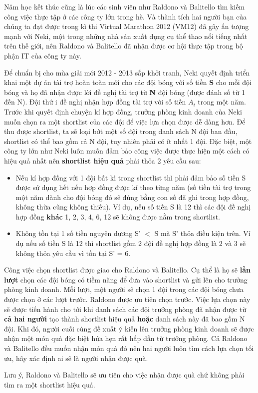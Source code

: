 Năm học kết thúc cũng là lúc các sinh viên như Raldono và Balitello tìm kiếm công việc thực tập ở các công ty lớn trong hè. Và thành tích hai người bạn của chúng ta đạt được trong kì thi Virtual Marathon 2012 (VM12) đã gây ấn tượng mạnh với Neki, một trong những nhà sản xuất dụng cụ thể thao nổi tiếng nhất trên thế giới, nên Raldono và Balitello đã nhận được cơ hội thực tập trong bộ phận IT của công ty này.

Để chuẩn bị cho mùa giải mới 2012 - 2013 sắp khởi tranh, Neki quyết định triển khai một dự án tài trợ hoàn toàn mới cho các đội bóng với số tiền \textbf{ S } cho mỗi đội bóng và họ đã nhận được lời đề nghị tài trợ từ \textbf{ N } đội bóng (được đánh số từ 1 đến N). Đội thứ i đề nghị nhận hợp đồng tài trợ với số tiền \textbf{ $A_{i}$} trong một năm. Trước khi quyết định chuyện kí hợp đồng, trưởng phòng kinh doanh của Neki muốn chọn ra một shortlist của các đội để việc lựa chọn được dễ dàng hơn. Để thu được shortlist, ta sẽ loại bớt một số đội trong danh sách N đội ban đầu, shortlist có thể bao gồm cả N đội, tuy nhiên phải có ít nhất 1 đội. Đặc biệt, một công ty lớn như Neki luôn muốn đảm bảo công việc được thực hiện một cách có hiệu quả nhất nên \textbf{ shortlist hiệu quả } phải thỏa 2 yêu cầu sau:
\begin{itemize}
	\item Nếu kí hợp đồng với 1 đội bất kì trong shortlist thì phải đảm bảo số tiền S được sử dụng hết nếu hợp đồng được kí theo từng năm (số tiền tài trợ trong một năm dành cho đội bóng đó sẽ đúng bằng con số đã ghi trong hợp đồng, không thừa cũng không thiếu). Ví dụ, nếu số tiền S là 12 thì các đội đề nghị hợp đồng \textbf{ khác } 1, 2, 3, 4, 6, 12 sẽ không được nằm trong shortlist.
\end{itemize}
\begin{itemize}
	\item Không tồn tại 1 số tiền nguyên dương S' $<$ S mà S' thỏa điều kiện trên. Ví dụ nếu số tiền S là 12 thì shortlist gồm 2 đội đề nghị hợp đồng là 2 và 3 sẽ không thỏa yêu cầu vì tồn tại S' = 6.
\end{itemize}

Công việc chọn shortlist được giao cho Raldono và Balitello. Cụ thể là họ sẽ \textbf{ lần lượt } chọn các đội bóng có tiềm năng để đưa vào shortlist và gửi lên cho trưởng phòng kinh doanh. Mỗi lượt, một người sẽ chọn 1 đội trong các đội bóng chưa được chọn ở các lượt trước. Raldono được ưu tiên chọn trước. Việc lựa chọn này sẽ được tiến hành cho tới khi danh sách các đội trưởng phòng đã nhận được từ \textbf{ cả hai người } tạo thành shortlist hiệu quả \textbf{ hoặc } danh sách này đã bao gồm N đội. Khi đó, người cuối cùng đề xuất ý kiến lên trưởng phòng kinh doanh sẽ được nhận một món quà đặc biệt hứa hẹn rất hấp dẫn từ trưởng phòng. Cả Raldono và Balitello đều muốn nhận món quà đó nên hai người luôn tìm cách lựa chọn tối ưu, hãy xác định ai sẽ là người nhận được quà.

Lưu ý, Raldono và Balitello sẽ ưu tiên cho việc nhận được quà chứ không phải tìm ra một shortlist hiệu quả.